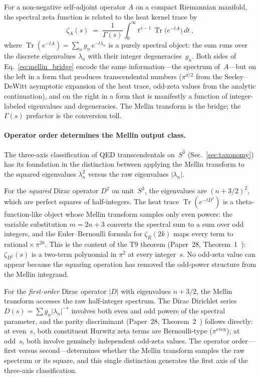 \documentclass[aps,pra,twocolumn,superscriptaddress,longbibliography]{revtex4-2}
\begin{document}
For a non-negative self-adjoint operator $A$ on a compact Riemannian
manifold, the spectral zeta function is related to the heat kernel trace
by~\cite{seeley1967,minakshisundaram1949}
\begin{equation}\label{eq:mellin_bridge}
  \zeta_A(s) \;=\; \frac{1}{\Gamma(s)} \int_0^\infty t^{s-1}\,
  \operatorname{Tr}\bigl(e^{-tA}\bigr)\,dt\,,
\end{equation}
where $\operatorname{Tr}(e^{-tA}) = \sum_n g_n\,e^{-t\lambda_n}$ is a
purely spectral object: the sum runs over the discrete eigenvalues
$\lambda_n$ with their integer degeneracies~$g_n$.  Both sides of
Eq.~\eqref{eq:mellin_bridge} encode the same information---the spectrum
of~$A$---but on the left in a form that produces transcendental numbers
($\pi^{d/2}$ from the Seeley--DeWitt asymptotic expansion of the heat
trace, odd-zeta values from the analytic continuation), and on the right
in a form that is manifestly a function of integer-labeled eigenvalues
and degeneracies.  The Mellin transform is the bridge; the $\Gamma(s)$
prefactor is the conversion toll.

\paragraph{Operator order determines the Mellin output class.}
The three-axis classification of QED transcendentals on~$S^3$
(Sec.~\ref{sec:taxonomy}) has its foundation in the distinction between
applying the Mellin transform to the squared eigenvalues $\lambda_n^2$
versus the raw eigenvalues $|\lambda_n|$.

For the \emph{squared} Dirac operator $D^2$ on unit~$S^3$, the
eigenvalues are $(n + 3/2)^2$, which are perfect squares of half-integers.
The heat trace $\operatorname{Tr}(e^{-tD^2})$ is a theta-function-like
object whose Mellin transform samples only even powers: the variable
substitution $m = 2n+3$ converts the spectral sum to a sum over odd
integers, and the Euler--Bernoulli formula for $\zeta_R(2k)$ maps every
term to $\text{rational} \times \pi^{2k}$.  This is the content of the
T9 theorem (Paper~28, Theorem~1~\cite{loutey_paper28}):
$\zeta_{D^2}(s)$ is a two-term polynomial in $\pi^2$ at every
integer~$s$.  No odd-zeta value can appear because the squaring
operation has removed the odd-power structure from the Mellin integrand.

For the \emph{first-order} Dirac operator $|D|$ with eigenvalues
$n + 3/2$, the Mellin transform accesses the raw half-integer spectrum.
The Dirac Dirichlet series $D(s) = \sum g_n |\lambda_n|^{-s}$ involves
both even and odd powers of the spectral parameter, and the parity
discriminant (Paper~28, Theorem~2~\cite{loutey_paper28}) follows
directly: at even~$s$, both constituent Hurwitz zeta terms are
Bernoulli-type ($\pi^{\text{even}}$); at odd~$s$, both involve
genuinely independent odd-zeta values.  The operator order---first
versus second---determines whether the Mellin transform samples the
raw spectrum or its square, and this single distinction generates the
first axis of the three-axis classification.
\end{document}
